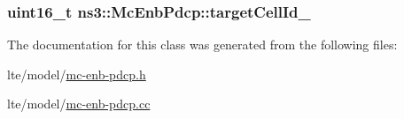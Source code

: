 \subsubsection[{\texorpdfstring{target\+Cell\+Id\+\_\+2}{targetCellId_2}}]{\setlength{\rightskip}{0pt plus 5cm}uint16\+\_\+t ns3\+::\+Mc\+Enb\+Pdcp\+::target\+Cell\+Id\+\_\hspace{0.3cm}{\ttfamily [private]}}\hypertarget{classns3_1_1McEnbPdcp_a6dc7c7ba7f3f52242b52efd2aac0ac72}{}\label{classns3_1_1McEnbPdcp_a6dc7c7ba7f3f52242b52efd2aac0ac72}


The documentation for this class was generated from the following files\+:\begin{DoxyCompactItemize}
\item 
lte/model/\hyperlink{mc-enb-pdcp_8h}{mc-\/enb-\/pdcp.\+h}\item 
lte/model/\hyperlink{mc-enb-pdcp_8cc}{mc-\/enb-\/pdcp.\+cc}\end{DoxyCompactItemize}
